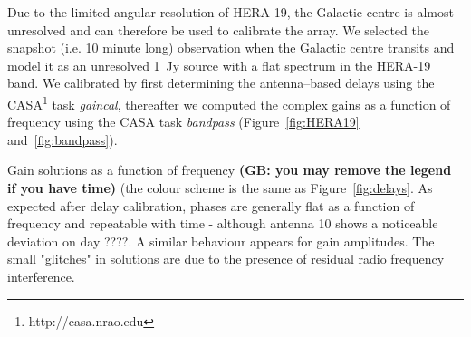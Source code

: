 \documentclass[a0,portrait]{a0poster}
\begin{document}
\begin{multicols}{2}
Due to the limited angular resolution of HERA-19, the Galactic centre is almost unresolved and can therefore be used to calibrate the array.
We selected the snapshot (i.e. 10 minute long) observation when the Galactic centre transits and model it as an unresolved 1~Jy source with a flat spectrum in the HERA-19 band. We calibrated by first determining the antenna--based delays using the CASA\footnote{http://casa.nrao.edu} task {\it gaincal}, thereafter we computed the complex gains as a function of frequency using the CASA task {\it bandpass} (Figure~\ref{fig:HERA19} and~\ref{fig:bandpass}).
%
\begin{minipage}{\columnwidth}
    \makeatletter
    \newcommand{\@captype}{figure}
    \makeatother
    \centering
    \qquad%
    \caption{Gain solutions as a function of frequency {\bf (GB: you may remove the legend if you have time)} (the colour scheme is the same as Figure~\ref{fig:delays}. As expected after delay calibration, phases are generally flat as a function of frequency and repeatable with time - although antenna 10 shows a noticeable deviation on day ????. A similar behaviour appears for gain amplitudes. The small "glitches" in solutions are due to the presence of residual radio frequency interference.}
\label{fig:bandpass}
  \end{minipage}


\end{multicols}
\end{document}
